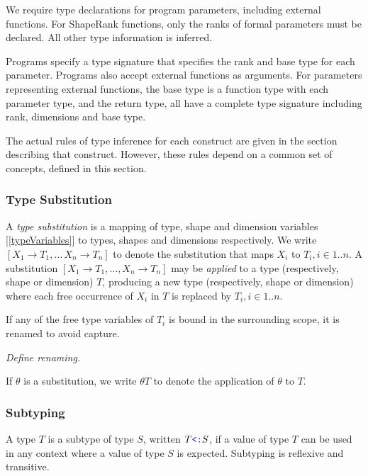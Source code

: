 \documentclass{article}
\begin{document}
{We require type declarations for program parameters, including external functions.
For ShapeRank functions, only the ranks of formal parameters must be declared. All other type information is inferred.

Programs specify a type signature that specifies the rank and base type for each parameter. Programs also accept external functions as arguments.
For parameters representing external functions, the base type is  a function type with each parameter type, and the return type, all have a complete type signature including rank, dimensions and base type.

The actual rules of type inference for each construct are given in the section describing that construct. However, these rules depend on a common set of concepts, defined in this section.
 
  
  \subsubsection{Type Substitution}
  \label{typeSubstitution}
  
  A {\em type substitution} is a mapping of type, shape and dimension variables [\ref{typeVariables}] to types, shapes and dimensions respectively. We write $[X_1 \to T_1, \ldots\, X_n \to T_n]$ to denote the substitution that maps $X_i$ to $T_i, i \in 1..n$. A substitution $[X_1 \to T_1, \ldots, X_n \to T_n]$ may be {\em applied} to a type (respectively, shape or dimension) $T$, producing a new type (respectively, shape or dimension) where each free occurrence of $X_i$ in $T$ is replaced by $T_i ,i \in 1..n$.
  
If any of the free type variables of $T_i$ is bound in the surrounding scope, it is renamed to avoid capture.

{\em Define renaming.}

  
If $\theta$ is a substitution, we write $\theta T$ to denote the application of $\theta$ to $T$.

\subsubsection{Subtyping}
\label{subtyping}

A type $T$ is a subtype of type $S$, written $T \texttt{\color{blue} \tt<:}{} S$, if a value of type $T$ can be used in any context where a value  of type $S$ is expected. Subtyping is reflexive and transitive.

}
\end{document}
